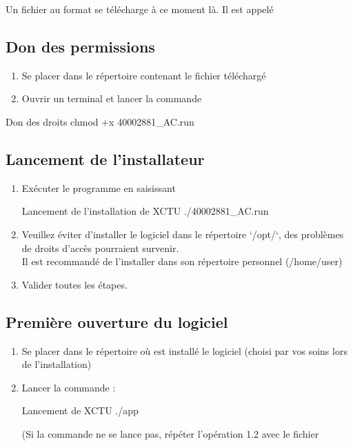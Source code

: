 

Un fichier au format  se télécharge à ce moment là. Il est appelé 

\subsection{Don des permissions}

\begin{enumerate}
    \item Se placer dans le répertoire contenant le fichier téléchargé \\
    \item Ouvrir un terminal et lancer la commande \\
\end{enumerate}

\begin{Bash}{Don des droits}
chmod +x 40002881_AC.run
\end{Bash}
\subsection{Lancement de l'installateur}

\begin{enumerate}

    \item Exécuter le programme en saisissant 
    
\begin{Bash}{Lancement de l'installation de XCTU}
./40002881_AC.run
\end{Bash}

    \item Veuillez éviter d'installer le logiciel dans le répertoire `/opt/`, des problèmes de droits d'accès pourraient survenir. \\
    Il est recommandé de l'installer dans son répertoire personnel (/home/user)

    \item Valider toutes les étapes. 

\end{enumerate}

\subsection{Première ouverture du logiciel}

\begin{enumerate}

    \item Se placer dans le répertoire où est installé le logiciel (choisi par vos soins lors de l'installation) 

\item Lancer la commande :
\begin{Bash}{Lancement de XCTU}
./app
\end{Bash}

(Si la commande ne se lance pas, répéter l'opération 1.2 avec le fichier 
    
\end{enumerate}

